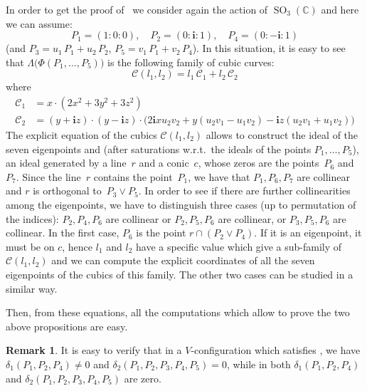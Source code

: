 \documentclass{amsart}
\theoremstyle{plain}
\theoremstyle{definition}
\newtheorem{rmk}[lemma]{Remark}
\newcommand{\C}{\mathbb{C}}
\newcommand{\SO}{\operatorname{SO}}
\newcommand{\iii}{\textbf{i}}
\begin{document}
In order to get the proof of~
we consider again the action of $\SO_3(\C)$ and here we can assume:
%
\[
  P_1 = (1: 0: 0), \quad
  P_2 = (0: \iii: 1), \quad
  P_4 = (0: -\iii: 1)
\]
%
(and $P_3 = u_1 \, P_1 + u_2 \, P_2$, $P_5 = v_1 \, P_1 + v_2 \, P_4$). 
In this situation, it
is easy to see that $\Lambda\bigl(\Phi(P_1, \dots, P_5)\bigr)$
is the following family of cubic curves:
%
\[
  \mathcal{C}(l_1, l_2) = l_1 \, \mathcal{C}_1 + l_2 \, \mathcal{C}_2
\]
%
where
%
\begin{align*}
  \mathcal{C}_1 & = x \cdot \left(2x^{2} + 3 y^{2} + 3 z^{2}\right)\\
  \mathcal{C}_2 & = (y + \iii z) \cdot (y - \iii z)
  \cdot \bigl(2 \iii x u_{2} v_{2} + y (u_{2} v_{1}- u_{1} v_{2})
  - \iii z (u_{2} v_{1} + u_{1} v_{2})\bigr)
\end{align*}
%
The explicit equation of the cubics $\mathcal{C}(l_1, l_2)$ allows to
construct the ideal of the seven eigenpoints and (after
saturations w.r.t.\ the ideals of the points $P_1, \dotsc, P_5$),
an ideal generated by a line~$r$ and a conic~$c$, whose zeros are
the points~$P_6$ and~$P_7$. Since the line~$r$ contains the point~$P_1$,
we have that $P_1, P_6, P_7$ are collinear and $r$ is orthogonal to~$P_3 \vee P_5$.
In order to see if there are further collinearities among the
eigenpoints, we have to distinguish three cases (up to permutation
of the indices): $P_2, P_4, P_6$ are collinear or $P_2, P_5, P_6$ are
collinear, or $P_3, P_5, P_6$ are collinear. In the first case, $P_6$
is the point $r \cap (P_2\vee P_4)$. If it is an eigenpoint, it must be
on $c$, hence $l_1$ and $l_2$ have a specific value which give a sub-family
of $\mathcal{C}(l_1, l_2)$ and we can compute the explicit coordinates of
all the seven eigenpoints of the cubics of this family. The other two
cases can be studied in a similar way.

Then, from these equations, all the computations which allow to prove
the two above propositions are easy.
%
\begin{rmk}
\label{rmk:delta1_and_delta2}
It is easy to verify that in
a $V$-configuration which satisfies , we have
$\delta_1(P_1, P_2, P_4)\neq 0$ and
$\delta_2(P_1, P_2, P_3, P_4, P_5) = 0$,
while in  both $\delta_1(P_1, P_2, P_4)$ and
$\delta_2(P_1, P_2, P_3, P_4, P_5)$ are zero.
\end{rmk}
\end{document}
